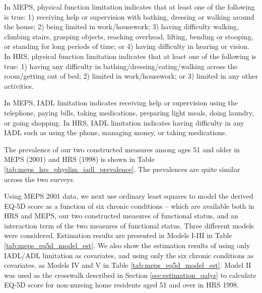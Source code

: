 In MEPS, physical function 
limitation indicates that at least one of the following is true: 1) receiving help 
or supervision with bathing, dressing or walking around the house; 2) being limited 
in work/housework; 3) having difficulty walking, climbing stairs, grasping objects, 
reaching overhead, lifting, bending or stooping, or standing for long periods of time; 
or 4) having difficulty in hearing or vision. In HRS, physical function limitation indicates 
that at least one of the following is 
true: 1) having any difficulty in bathing/dressing/eating/walking across the room/getting 
out of bed; 2) limited in work/housework; or 3) limited in any other activities.

In MEPS, IADL limitation indicates receiving help or supervision using the telephone, 
paying bills, taking medications, preparing light meals, doing laundry, or going shopping.
In HRS, IADL limitation indicates having difficulty in any IADL such as using the phone, managing 
money, or taking medications. 

The prevalence of our two constructed measures among ages 51 and older in MEPS (2001) and HRS (1998) is 
shown in Table \ref{tab:meps_hrs_physlim_iadl_prevalence}. The prevalences are quite similar across the two surveys. 

Using MEPS 2001 data, we next use ordinary least squares to model the derived EQ-5D score as a function of six 
chronic conditions -- which are available both in HRS and MEPS, our two constructed measures of functional status, 
and an interaction term of the two measures of functional status. Three different models were considered. 
Estimation results are presented in Models I-III in Table \ref{tab:meps_eq5d_model_est}. We also show the estimation results of using only 
IADL/ADL limitation as covariates, and using only the six chronic conditions as covariates, as Models IV and V in 
Table \ref{tab:meps_eq5d_model_est}. Model II was used as the crosswalk described 
in Section \ref{sec:estimation_qalys} to calculate EQ-5D score for non-nursing 
home residents aged 51 and over in HRS 1998.



